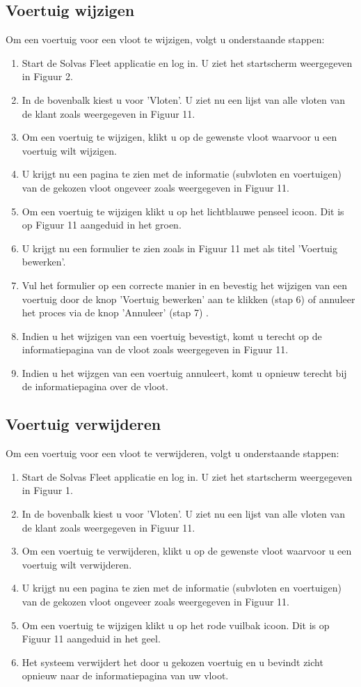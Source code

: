 \documentclass[11pt,openany]{article}
\begin{document}
\subsection{Voertuig wijzigen}
Om een voertuig voor een vloot te wijzigen, volgt u onderstaande stappen:
\begin{enumerate}
	\item Start de Solvas Fleet applicatie en log in. U ziet het startscherm weergegeven in Figuur 2.
	\item In de bovenbalk kiest u voor 'Vloten'. U ziet nu een lijst van alle vloten van de klant zoals weergegeven in Figuur 11.
	\item Om een voertuig te wijzigen, klikt u op de gewenste vloot waarvoor u een voertuig wilt wijzigen. 
	\item U krijgt nu een pagina te zien met de informatie (subvloten en voertuigen) van de gekozen vloot
	ongeveer zoals weergegeven in Figuur 11. 
	\item Om een voertuig te wijzigen klikt u op het lichtblauwe penseel icoon. Dit is op Figuur 11 aangeduid in het groen.
	\item U krijgt nu een formulier te zien zoals in Figuur 11 met als titel 'Voertuig bewerken'.
	\item Vul het formulier op een correcte manier in en bevestig het wijzigen van een voertuig door de knop 'Voertuig bewerken' aan te klikken (stap 6) of annuleer het proces via de knop 'Annuleer' (stap 7) .
	\item Indien u het wijzigen van een voertuig bevestigt, komt u terecht op de informatiepagina van de vloot zoals weergegeven in Figuur 11. 
	\item Indien u het wijzgen van een voertuig annuleert, komt u opnieuw terecht bij de informatiepagina over de vloot.
\end{enumerate}

\subsection{Voertuig verwijderen}
Om een voertuig voor een vloot te verwijderen, volgt u onderstaande stappen:
\begin{enumerate}
	\item Start de Solvas Fleet applicatie en log in. U ziet het startscherm weergegeven in Figuur 1.
	\item In de bovenbalk kiest u voor 'Vloten'. U ziet nu een lijst van alle vloten van de klant zoals weergegeven in Figuur 11.
	\item Om een voertuig te verwijderen, klikt u op de gewenste vloot waarvoor u een voertuig wilt verwijderen. 
	\item U krijgt nu een pagina te zien met de informatie (subvloten en voertuigen) van de gekozen vloot
	ongeveer zoals weergegeven in Figuur 11. 
	\item Om een voertuig te wijzigen klikt u op het rode vuilbak icoon. Dit is op Figuur 11 aangeduid in het geel.
	\item Het systeem verwijdert het door u gekozen voertuig en u bevindt zicht opnieuw naar de informatiepagina van uw vloot.
\end{enumerate}
\end{document}
